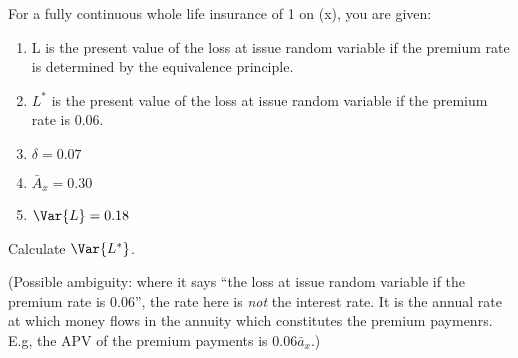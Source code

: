 For a fully continuous whole life insurance of 1 on (x), you are given:
\begin{enumerate}
    \item L is the present value of the loss at issue random variable if the premium rate is determined by the equivalence principle.
    \item $L^*$ is the present value of the loss at issue random variable if the premium rate is 0.06.
    \item $\delta = 0.07$
    \item $\bar{A}_x = 0.30$
    \item $\Var{L}=0.18$
\end{enumerate}
Calculate $\Var{L^*}$.

\medskip
(Possible ambiguity: where it says ``the loss at issue random variable if the premium rate is 0.06'', the rate here is {\it not} the interest rate. It is the annual rate at
which money flows in the annuity which constitutes the premium paymenrs. E.g, the APV of the premium payments is $0.06\bar{a}_x$.)



